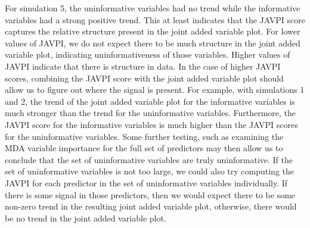 \documentclass[12pt,twoside]{reedthesis}
\theoremstyle{definition}
\theoremstyle{definition}
\theoremstyle{definition}
\theoremstyle{remark}
\begin{document}
For simulation 5, the uninformative variables had no trend while the
informative variables had a strong positive trend. This at least
indicates that the JAVPI score captures the relative structure present
in the joint added variable plot. For lower values of JAVPI, we do not
expect there to be much structure in the joint added variable plot,
indicating uninformativeness of those variables. Higher values of JAVPI
indicate that there is structure in data. In the case of higher JAVPI
scores, combining the JAVPI score with the joint added variable plot
should allow us to figure out where the signal is present. For example,
with simulations 1 and 2, the trend of the joint added variable plot for
the informative variables is much stronger than the trend for the
uninformative variables. Furthermore, the JAVPI score for the
informative variables is much higher than the JAVPI scores for the
uninformative variables. Some further testing, such as examining the MDA
variable importance for the full set of predictors may then allow us to
conclude that the set of uninformative variables are truly
uninformative. If the set of uninformative variables is not too large,
we could also try computing the JAVPI for each predictor in the set of
uninformative variables individually. If there is some signal in those
predictors, then we would expect there to be some non-zero trend in the
resulting joint added variable plot, otherwise, there would be no trend
in the joint added variable plot. \par 
\end{document}
